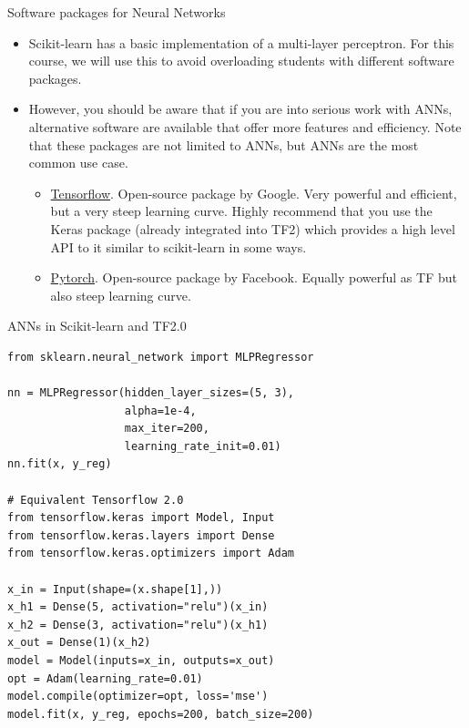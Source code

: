 \documentclass{beamer}
\begin{document}
\begin{frame}{Software packages for Neural Networks}
    \begin{itemize}
        \item Scikit-learn has a basic implementation of a multi-layer perceptron. For this course, we will use this to avoid overloading students with different software packages.
        \item However, you should be aware that if you are into serious work with ANNs, alternative software are available that offer more features and efficiency. Note that these packages are not limited to ANNs, but ANNs are the most common use case.
        \begin{itemize}
            \item \href{https://www.tensorflow.org/}{Tensorflow}. Open-source package by Google. Very powerful and efficient, but a very steep learning curve. Highly recommend that you use the Keras package (already integrated into TF2) which provides a high level API to it similar to scikit-learn in some ways.
            \item \href{https://pytorch.org/}{Pytorch}. Open-source package by Facebook. Equally powerful as TF but also steep learning curve.
        \end{itemize}
    \end{itemize}
\end{frame}


\begin{frame}[fragile]{ANNs in Scikit-learn and TF2.0}
\begin{verbatim}
from sklearn.neural_network import MLPRegressor

nn = MLPRegressor(hidden_layer_sizes=(5, 3),
                  alpha=1e-4,
                  max_iter=200,
                  learning_rate_init=0.01)
nn.fit(x, y_reg)

# Equivalent Tensorflow 2.0
from tensorflow.keras import Model, Input
from tensorflow.keras.layers import Dense
from tensorflow.keras.optimizers import Adam

x_in = Input(shape=(x.shape[1],))
x_h1 = Dense(5, activation="relu")(x_in)
x_h2 = Dense(3, activation="relu")(x_h1)
x_out = Dense(1)(x_h2)
model = Model(inputs=x_in, outputs=x_out)
opt = Adam(learning_rate=0.01)
model.compile(optimizer=opt, loss='mse')
model.fit(x, y_reg, epochs=200, batch_size=200)
\end{verbatim}
\end{frame}
\end{document}
